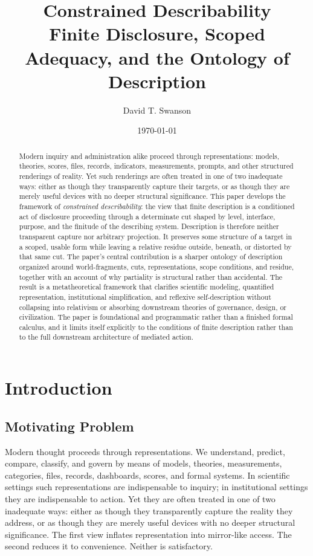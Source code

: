 \documentclass[11pt]{article}
\title{%
  \textbf{Constrained Describability}\\
  \large Finite Disclosure, Scoped Adequacy, and the Ontology of Description
}
\author{David T. Swanson}
\date{\today}
\renewcommand{\emph}[1]{\textit{#1}}
\begin{document}
\maketitle

\begin{abstract}
Modern inquiry and administration alike proceed through representations: models, theories, scores, files, records, indicators, measurements, prompts, and other structured renderings of reality. Yet such renderings are often treated in one of two inadequate ways: either as though they transparently capture their targets, or as though they are merely useful devices with no deeper structural significance. This paper develops the framework of \emph{constrained describability}: the view that finite description is a conditioned act of disclosure proceeding through a determinate cut shaped by level, interface, purpose, and the finitude of the describing system. Description is therefore neither transparent capture nor arbitrary projection. It preserves some structure of a target in a scoped, usable form while leaving a relative residue outside, beneath, or distorted by that same cut. The paper's central contribution is a sharper ontology of description organized around world-fragments, cuts, representations, scope conditions, and residue, together with an account of why partiality is structural rather than accidental. The result is a metatheoretical framework that clarifies scientific modeling, quantified representation, institutional simplification, and reflexive self-description without collapsing into relativism or absorbing downstream theories of governance, design, or civilization. The paper is foundational and programmatic rather than a finished formal calculus, and it limits itself explicitly to the conditions of finite description rather than to the full downstream architecture of mediated action.
\end{abstract}

\section{Introduction}

\subsection{Motivating Problem}

Modern thought proceeds through representations. We understand, predict, compare, classify, and govern by means of models, theories, measurements, categories, files, records, dashboards, scores, and formal systems. In scientific settings such representations are indispensable to inquiry; in institutional settings they are indispensable to action. Yet they are often treated in one of two inadequate ways: either as though they transparently capture the reality they address, or as though they are merely useful devices with no deeper structural significance. The first view inflates representation into mirror-like access. The second reduces it to convenience. Neither is satisfactory. \cite{frigg_hartmann_models_sep,frigg_nguyen_scientific_representation_sep,chakravartty_scientific_realism_sep}
\end{document}
